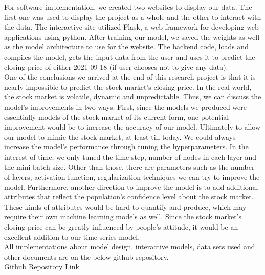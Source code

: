 \documentclass{article}
\begin{document}
For software implementation, we created two websites to display our data. The first one was used to display the project as a whole and the other to interact with the data. The interactive site utilized Flask, a web framework for developing web applications using python. After training our model, we saved the weights as well as the model architecture to use for the website. The backend code, loads and compiles the model, gets the input data from the user and uses it to predict the closing price of either 2021-09-18 (if user chooses not to give any data).\\

One of the conclusions we arrived at the end of this research project is that it is nearly impossible to predict the stock market’s closing price. In the real world, the stock market is volatile, dynamic and unpredictable. Thus, we can discuss the model’s improvements in two ways. First, since the models we produced were essentially models of the stock market of its current form, one potential improvement would be to increase the accuracy of our model. Ultimately to allow our model to mimic the stock market, at least till today. We could always increase the model’s performance through tuning the hyperparameters. In the interest of time, we only tuned the time step, number of nodes in each layer and the mini-batch size. Other than those, there are parameters such as the number of layers, activation function, regularization techniques we can try to improve the model. Furthermore, another direction to improve the model is to add additional attributes that reflect the population’s confidence level about the stock market. These kinds of attributes would be hard to quantify and produce, which may require their own machine learning models as well. Since the stock market’s closing price can be greatly influenced by people’s attitude, it would be an excellent addition to our time series model.\\

All implementations about model design, interactive models, data sets used and other documents are on the below github repository.\\
\href{https://github.com/nfax117/ECS171_Proj1}{Github Repository Link}
            
\end{document}
